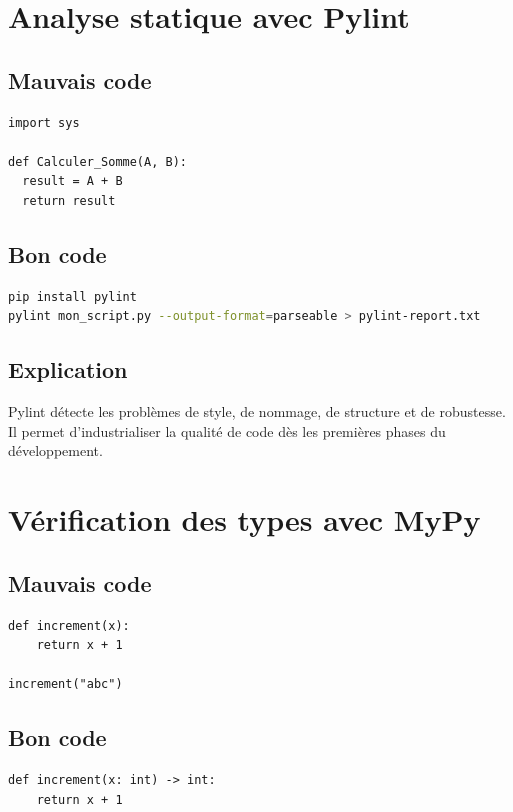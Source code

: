 \documentclass[a4paper,11pt]{report}
\begin{document}
\chapter{Analyse statique avec Pylint}

\section{Mauvais code}
\begin{lstlisting}
import sys

def Calculer_Somme(A, B):
  result = A + B
  return result
\end{lstlisting}

\section{Bon code}
\begin{lstlisting}[language=bash]
pip install pylint
pylint mon_script.py --output-format=parseable > pylint-report.txt
\end{lstlisting}

\section{Explication}
Pylint détecte les problèmes de style, de nommage, de structure et de robustesse.
Il permet d'industrialiser la qualité de code dès les premières phases du développement.

\chapter{Vérification des types avec MyPy}

\section{Mauvais code}
\begin{lstlisting}
def increment(x):
    return x + 1

increment("abc")
\end{lstlisting}

\section{Bon code}
\begin{lstlisting}
def increment(x: int) -> int:
    return x + 1
\end{lstlisting}
\end{document}
